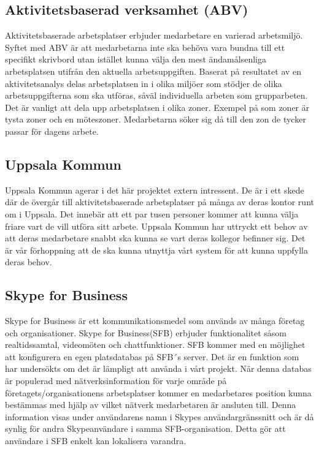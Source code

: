 \documentclass[swedish, a4paper,12pt]{article}
\begin{document}
\subsection{Aktivitetsbaserad verksamhet (ABV)}
Aktivitetsbaserade arbetsplatser erbjuder medarbetare en varierad arbetsmiljö. Syftet med ABV är att medarbetarna inte ska behöva vara bundna till ett specifikt skrivbord utan istället kunna välja den mest ändamålsenliga arbetsplatsen utifrån den aktuella arbetsuppgiften. %
Baserat på resultatet av en aktivitetsanalys delas arbetsplatsen in i olika miljöer som stödjer de olika arbetsuppgifterna som ska utföras, såväl individuella arbeten som grupparbeten. Det är vanligt att dela upp arbetsplatsen i olika zoner. Exempel på som zoner är tysta zoner och en möteszoner. Medarbetarna söker sig då till den zon de tycker passar för dagens arbete. \cite{ABV}



	\subsection{Uppsala Kommun}
  Uppsala Kommun agerar i det här projektet extern intressent. De är i ett skede där de övergår till aktivitetsbaserade arbetsplatser på många av deras kontor runt om i Uppsala. Det innebär att %
  ett par tusen personer kommer att kunna välja friare vart de vill utföra sitt arbete. Uppsala Kommun har uttryckt ett behov av att deras medarbetare snabbt ska kunna se vart deras kollegor befinner sig. Det är vår förhoppning att de ska kunna utnyttja vårt system för att kunna uppfylla deras behov.

	\subsection{Skype for Business}
    Skype for Business är ett kommunikationsmedel som används av många företag och organisationer. Skype for Business(SFB) erbjuder funktionalitet såsom realtidssamtal, videomöten och chattfunktioner. SFB kommer med en möjlighet att konfigurera en egen platsdatabas på SFB´s server.\cite{Microsoft-Office} Det är en funktion som har undersökts om det är lämpligt att använda i vårt projekt. När denna databas är populerad med nätverksinformation för varje område på företagets/organisationens arbetsplatser kommer en medarbetares position kunna bestämmas med hjälp av vilket nätverk medarbetaren är ansluten till. Denna information visas under användarens namn i Skypes användargränssnitt och är då synlig för andra Skypeanvändare i samma SFB-organisation. Detta gör att användare i SFB enkelt kan lokalisera varandra.
\end{document}
